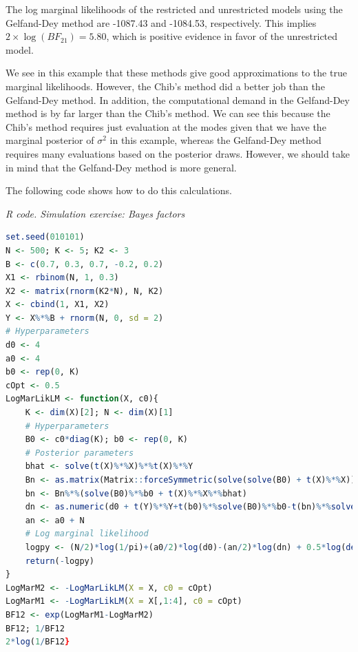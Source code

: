 The log marginal likelihoods of the restricted and unrestricted models using the Gelfand-Dey method are -1087.43 and -1084.53, respectively. This implies $2\times \log(BF_{21})=5.80$, which is positive evidence in favor of the unrestricted model.

We see in this example that these methods give good approximations to the true marginal likelihoods. However, the Chib's method did a better job than the Gelfand-Dey method. In addition, the computational demand in the Gelfand-Dey method is by far larger than the Chib's method. We can see this because the Chib's method requires just evaluation at the modes given that we have the marginal posterior of $\sigma^2$ in this example, whereas the Gelfand-Dey method requires many evaluations based on the posterior draws. However, we should take in mind that the Gelfand-Dey method is more general.

The following code shows how to do this calculations.

\begin{tcolorbox}[enhanced,width=4.67in,center upper,
	fontupper=\large\bfseries,drop shadow southwest,sharp corners]
	\textit{R code. Simulation exercise: Bayes factors}
	\begin{VF}
		\begin{lstlisting}[language=R]
set.seed(010101)
N <- 500; K <- 5; K2 <- 3 
B <- c(0.7, 0.3, 0.7, -0.2, 0.2) 
X1 <- rbinom(N, 1, 0.3)
X2 <- matrix(rnorm(K2*N), N, K2)
X <- cbind(1, X1, X2)
Y <- X%*%B + rnorm(N, 0, sd = 2)
# Hyperparameters
d0 <- 4
a0 <- 4
b0 <- rep(0, K)
cOpt <- 0.5
LogMarLikLM <- function(X, c0){
	K <- dim(X)[2]; N <- dim(X)[1]	
	# Hyperparameters
	B0 <- c0*diag(K); b0 <- rep(0, K)
	# Posterior parameters
	bhat <- solve(t(X)%*%X)%*%t(X)%*%Y
	Bn <- as.matrix(Matrix::forceSymmetric(solve(solve(B0) + t(X)%*%X))) 
	bn <- Bn%*%(solve(B0)%*%b0 + t(X)%*%X%*%bhat)
	dn <- as.numeric(d0 + t(Y)%*%Y+t(b0)%*%solve(B0)%*%b0-t(bn)%*%solve(Bn)%*%bn)
	an <- a0 + N
	# Log marginal likelihood
	logpy <- (N/2)*log(1/pi)+(a0/2)*log(d0)-(an/2)*log(dn) + 0.5*log(det(Bn)/det(B0)) + lgamma(an/2)-lgamma(a0/2)
	return(-logpy)
}
LogMarM2 <- -LogMarLikLM(X = X, c0 = cOpt)
LogMarM1 <- -LogMarLikLM(X = X[,1:4], c0 = cOpt)
BF12 <- exp(LogMarM1-LogMarM2) 
BF12; 1/BF12
2*log(1/BF12}
\end{lstlisting}
	\end{VF}
\end{tcolorbox}            


